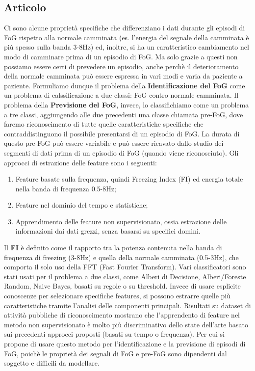 \documentclass[a4paper,11pt]{article} %
\begin{document}
\subsection{Articolo}
Ci sono alcune proprietà specifiche che differenziano i dati durante gli episodi di FoG rispetto alla normale camminata (es. l'energia del segnale della camminata è più spesso sulla banda 3-8Hz) ed, inoltre, si ha un caratteristico cambiamento nel modo di camminare prima di un episodio di FoG. Ma solo grazie a questi non possiamo essere certi di prevedere un episodio, anche perchè il deterioramento della normale camminata può essere espressa in vari modi e varia da paziente a paziente.\linebreak
Formuliamo dunque il problema della \textbf{Identificazione del FoG} come un problema di calssificazione a due classi: FoG contro normale camminata. Il problema della \textbf{Previsione del FoG}, invece, lo classifichiamo come un problema a tre classi, aggiungendo alle due precedenti una classe chiamata pre-FoG, dove faremo riconoscimento di tutte quelle caratteristiche specifiche che contraddistinguono il possibile presentarsi di un episodio di FoG. La durata di questo pre-FoG può essere variabile e può essere ricavato dallo studio dei segmenti di dati prima di un episodio di FoG (quando viene riconosciuto). Gli approcci di estrazione delle feature sono i seguenti:
\begin{enumerate}
\item Feature basate sulla frequenza, quindi Freezing Index (FI) ed energia totale nella banda di frequenza 0.5-8Hz;
\item Feature nel dominio del tempo e statistiche;
\item Apprendimento delle feature non supervisionato, ossia estrazione delle informazioni dai dati grezzi, senza basarsi su specifici domini.
\end{enumerate}
Il \textbf{FI} è definito come il rapporto tra la potenza contenuta nella banda di frequenza di freezing (3-8Hz) e quella della normale camminata (0.5-3Hz), che comporta il solo uso della FFT (Fast Fourier Transform). Vari classificatori sono stati usati per il problema a due classi, come Alberi di Decisione, Alberi/Foreste Random, Naive Bayes, basati su regole o su threshold. Invece di usare esplicite conoscenze per selezionare specifiche features, si possono estrarre quelle più caratteristiche tramite l'analisi delle componenti principali.  Risultati su dataset di attività pubbliche di riconoscimento mostrano che l'apprendento di feature nel metodo non supervisionato è molto più discriminativo dello state dell'arte basato sui precedenti approcci proposti (basati su tempo o frequenza). Per cui si propone di usare questo metodo per l'identificazione e la previsione di episodi di FoG, poichè le proprietà dei segnali di FoG e pre-FoG sono dipendenti dal soggetto e difficili da modellare.\linebreak
\end{document}
